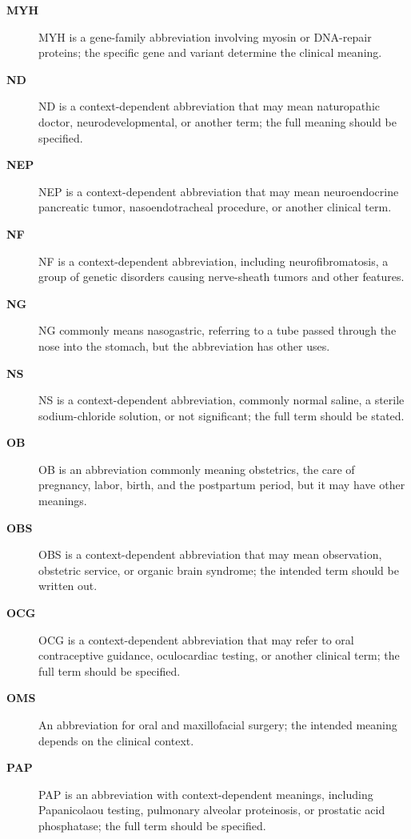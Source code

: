 \begin{description}
\item[\textbf{MYH}] MYH is a gene-family abbreviation involving myosin or DNA-repair proteins; the specific gene and variant determine the clinical meaning.

\item[\textbf{ND}] ND is a context-dependent abbreviation that may mean naturopathic doctor, neurodevelopmental, or another term; the full meaning should be specified.

\item[\textbf{NEP}] NEP is a context-dependent abbreviation that may mean neuroendocrine pancreatic tumor, nasoendotracheal procedure, or another clinical term.

\item[\textbf{NF}] NF is a context-dependent abbreviation, including neurofibromatosis, a group of genetic disorders causing nerve-sheath tumors and other features.

\item[\textbf{NG}] NG commonly means nasogastric, referring to a tube passed through the nose into the stomach, but the abbreviation has other uses.

\item[\textbf{NS}] NS is a context-dependent abbreviation, commonly normal saline, a sterile sodium-chloride solution, or not significant; the full term should be stated.

\item[\textbf{OB}] OB is an abbreviation commonly meaning obstetrics, the care of pregnancy, labor, birth, and the postpartum period, but it may have other meanings.

\item[\textbf{OBS}] OBS is a context-dependent abbreviation that may mean observation, obstetric service, or organic brain syndrome; the intended term should be written out.

\item[\textbf{OCG}] OCG is a context-dependent abbreviation that may refer to oral contraceptive guidance, oculocardiac testing, or another clinical term; the full term should be specified.

\item[\textbf{OMS}] An abbreviation for oral and maxillofacial surgery; the intended meaning depends on the clinical context.

\item[\textbf{PAP}] PAP is an abbreviation with context-dependent meanings, including Papanicolaou testing, pulmonary alveolar proteinosis, or prostatic acid phosphatase; the full term should be specified.


\end{description}
